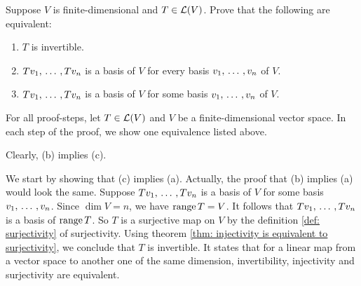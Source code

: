 \begin{xrcs}
  Suppose $V$ is finite-dimensional and $T \in \mathcal{L}(V)$. Prove that the following are equivalent:
  \begin{enumerate}
    \item $T$ is invertible.
    \item $T v_1, {\, \ldots \,\,}, T v_n$ is a basis of $V$ for every basis $v_1, {\, \ldots \,\,}, v_n$ of $V$.
    \item $T v_1, {\, \ldots \,\,}, T v_n$ is a basis of $V$ for some basis $v_1, {\, \ldots \,\,}, v_n$ of $V$.
  \end{enumerate}

  \begin{xprf}
    For all proof-steps, let $T \in \mathcal{L}(V)$ and $V$ be a finite-dimensional vector space. In each step of the proof, we show one equivalence listed above.

    \StepOne Clearly, (b) implies (c).

%
%
%

    \StepTwo We start by showing that (c) implies (a). Actually, the proof that (b) implies (a) would look the same. Suppose $T v_1, {\, \ldots \,\,}, T v_n$ is a basis of $V$ for some basis $v_1, {\, \ldots \,\,}, v_n$. Since $\dim V = n$, we have $\operatorname{range} T = V$. It follows that $Tv_1, {\, \ldots \,\,}, Tv_n$ is a basis of $\operatorname{range} T$. So $T$ is a surjective map on $V$ by the definition \ref{def: surjectivity} of surjectivity. Using theorem \ref{thm: injectivity is equivalent to surjectivity}, we conclude that $T$ is invertible. It states that for a linear map from a vector space to another one of the same dimension, invertibility, injectivity and surjectivity are equivalent.


\end{xprf}
\end{xrcs}
